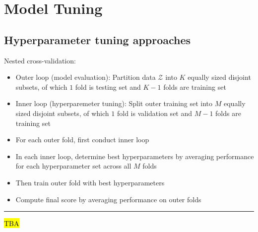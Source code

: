 \section{Model Tuning}
\subsection*{Hyperparameter tuning approaches}
Nested cross-validation:
\begin{itemize}
    \item Outer loop (model evaluation): Partition data $\mathcal{Z}$ into $K$ equally sized disjoint subsets, of which $1$ fold is testing set and $K-1$ folds are training set
    \item Inner loop (hyperparemeter tuning): Split outer training set into $M$ equally sized disjoint subsets, of which $1$ fold is validation set and $M-1$ folds are training set
    \item For each outer fold, first conduct inner loop
    \item In each inner loop, determine best hyperparameters by averaging performance for each hyperparameter set across all $M$ folds
    \item Then train outer fold with best hyperparameters
    \item Compute final score by averaging performance on outer folds
\end{itemize}

{\color{lightgray}\hrule height 0.001mm}

\hl{TBA}
